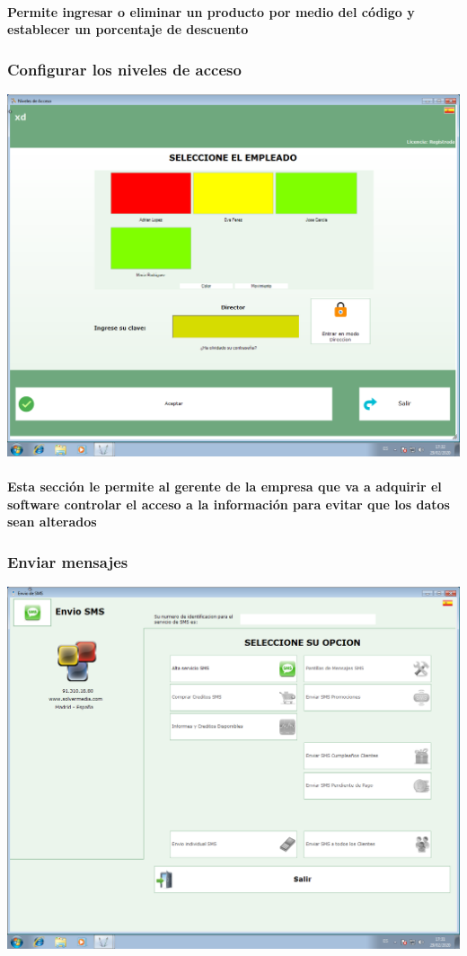 \documentclass[12pt,a4paper]{ articule }
\begin{document}
\paragraph{Permite ingresar o eliminar un producto por medio del código y establecer un porcentaje de descuento}

\subsubsection*{Configurar los niveles de acceso}
\includegraphics[scale=0.35]{Niveles de acceso.png}
\paragraph{Esta sección le permite al gerente de la empresa que va a adquirir el software controlar el acceso a la información para evitar que los datos sean alterados} 

\subsubsection*{Enviar mensajes}
\includegraphics[scale=0.35]{Envio SMS.png}
\end{document}
